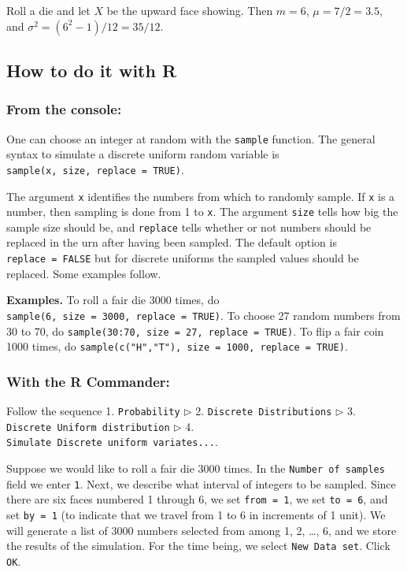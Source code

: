 \documentclass[]{book}
\numberwithin{equation}{chapter}
\numberwithin{figure}{chapter}
\theoremstyle{plain}
\theoremstyle{definition}
\theoremstyle{remark}
\theoremstyle{definition}
\theoremstyle{definition}
\theoremstyle{remark}
\let\BeginKnitrBlock\begin \let\EndKnitrBlock\end
\begin{document}
\bigskip

\BeginKnitrBlock{example}
\protect\hypertarget{ex:unnamed-chunk-203}{}{\label{ex:unnamed-chunk-203}}Roll
a die and let \(X\) be the upward face showing. Then \(m = 6\),
\(\mu = 7/2 = 3.5\), and \(\sigma^{2} = (6^{2} - 1)/12 = 35/12\).
\EndKnitrBlock{example}

\subsection{How to do it with R}\label{how-to-do-it-with-r-20}

\subsubsection{From the console:}\label{from-the-console}

One can choose an integer at random with the \texttt{sample} function.
The general syntax to simulate a discrete uniform random variable is
\texttt{sample(x,\ size,\ replace\ =\ TRUE)}.

The argument \texttt{x} identifies the numbers from which to randomly
sample. If \texttt{x} is a number, then sampling is done from 1 to
\texttt{x}. The argument \texttt{size} tells how big the sample size
should be, and \texttt{replace} tells whether or not numbers should be
replaced in the urn after having been sampled. The default option is
\texttt{replace\ =\ FALSE} but for discrete uniforms the sampled values
should be replaced. Some examples follow.

\textbf{Examples.} To roll a fair die 3000 times, do
\texttt{sample(6,\ size\ =\ 3000,\ replace\ =\ TRUE)}. To choose 27
random numbers from 30 to 70, do
\texttt{sample(30:70,\ size\ =\ 27,\ replace\ =\ TRUE)}. To flip a fair
coin 1000 times, do
\texttt{sample(c("H","T"),\ size\ =\ 1000,\ replace\ =\ TRUE)}.

\subsubsection{With the R Commander:}\label{with-the-r-commander}

Follow the sequence 1. \texttt{Probability} \(\triangleright\) 2.
\texttt{Discrete\ Distributions} \(\triangleright\) 3.
\texttt{Discrete\ Uniform\ distribution} \(\triangleright\) 4.
\texttt{Simulate\ Discrete\ uniform\ variates...}.

Suppose we would like to roll a fair die 3000 times. In the
\texttt{Number\ of\ samples} field we enter \texttt{1}. Next, we
describe what interval of integers to be sampled. Since there are six
faces numbered 1 through 6, we set \texttt{from\ =\ 1}, we set
\texttt{to\ =\ 6}, and set \texttt{by\ =\ 1} (to indicate that we travel
from 1 to 6 in increments of 1 unit). We will generate a list of 3000
numbers selected from among 1, 2, \ldots{}, 6, and we store the results
of the simulation. For the time being, we select
\texttt{New\ Data\ set}. Click \texttt{OK}.
\end{document}

